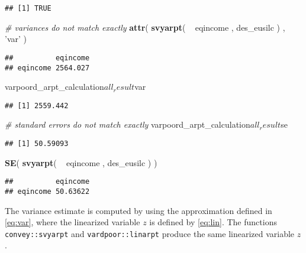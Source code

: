 \documentclass[]{book}
\newenvironment{Shaded}{\begin{snugshade}}{\end{snugshade}}
\newcommand{\KeywordTok}[1]{\textcolor[rgb]{0.13,0.29,0.53}{\textbf{{#1}}}}
\newcommand{\StringTok}[1]{\textcolor[rgb]{0.31,0.60,0.02}{{#1}}}
\newcommand{\CommentTok}[1]{\textcolor[rgb]{0.56,0.35,0.01}{\textit{{#1}}}}
\newcommand{\NormalTok}[1]{{#1}}
\theoremstyle{definition}
\theoremstyle{definition}
\theoremstyle{remark}
\begin{document}
\begin{verbatim}
## [1] TRUE
\end{verbatim}

\begin{Shaded}
\begin{Highlighting}[]
\CommentTok{# variances do not match exactly}
\KeywordTok{attr}\NormalTok{( }\KeywordTok{svyarpt}\NormalTok{( ~}\StringTok{ }\NormalTok{eqincome , des_eusilc ) , }\StringTok{'var'} \NormalTok{)}
\end{Highlighting}
\end{Shaded}

\begin{verbatim}
##          eqincome
## eqincome 2564.027
\end{verbatim}

\begin{Shaded}
\begin{Highlighting}[]
\NormalTok{varpoord_arpt_calculation$all_result$var}
\end{Highlighting}
\end{Shaded}

\begin{verbatim}
## [1] 2559.442
\end{verbatim}

\begin{Shaded}
\begin{Highlighting}[]
\CommentTok{# standard errors do not match exactly}
\NormalTok{varpoord_arpt_calculation$all_result$se}
\end{Highlighting}
\end{Shaded}

\begin{verbatim}
## [1] 50.59093
\end{verbatim}

\begin{Shaded}
\begin{Highlighting}[]
\KeywordTok{SE}\NormalTok{( }\KeywordTok{svyarpt}\NormalTok{( ~}\StringTok{ }\NormalTok{eqincome , des_eusilc ) )}
\end{Highlighting}
\end{Shaded}

\begin{verbatim}
##          eqincome
## eqincome 50.63622
\end{verbatim}

The variance estimate is computed by using the approximation defined in
\eqref{eq:var}, where the linearized variable \(z\) is defined by
\eqref{eq:lin}. The functions \texttt{convey::svyarpt} and
\texttt{vardpoor::linarpt} produce the same linearized variable \(z\).
\end{document}
